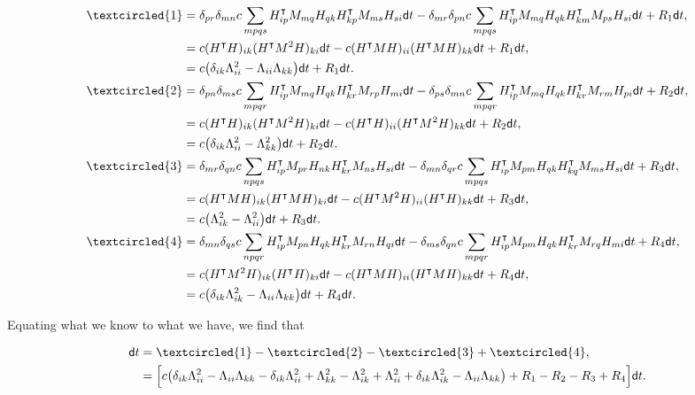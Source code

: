 \begin{align*}
    \textcircled{1} &= \delta_{pr}\delta_{mn}c\sum_{mpqs} \trans H_{ip} M_{mq} H_{qk} \trans H_{kp} M_{ms} H_{si} \d t - \delta_{mr}\delta_{pn} c \sum_{mpqs} \trans H_{ip} M_{mq} H_{qk} \trans H_{km} M_{ps} H_{si} \d t + R_1\d t,\\
    &= c(\trans H H)_{ik}(\trans H M^2 H)_{ki}\d t - c(\trans{H}MH)_{ii}(\trans{H}MH)_{kk}\d t + R_1\d t,\\
    &= c\bigl(\delta_{ik}\Lambda^2_{ii} - \Lambda_{ii}\Lambda_{kk}\bigr)\d t + R_1 \d t.\\
    \textcircled{2} &= \delta_{pn}\delta_{ms}c\sum_{mpqr} \trans H_{ip} M_{mq} H_{qk} \trans H_{kr} M_{rp} H_{mi} \d t - \delta_{ps}\delta_{mn} c \sum_{mpqr} \trans H_{ip} M_{mq} H_{qk} \trans H_{kr} M_{rm} H_{pi} \d t + R_2\d t,\\
    &= c(\trans H H)_{ik}(\trans H M^2 H)_{ki}\d t - c(\trans{H}H)_{ii}(\trans{H}M^2H)_{kk}\d t + R_2\d t,\\
    &= c\bigl(\delta_{ik}\Lambda^2_{ii} - \Lambda^2_{kk}\bigr)\d t + R_2 \d t.\\
    \textcircled{3} &= \delta_{mr}\delta_{qn}c\sum_{npqs} \trans H_{ip} M_{pr} H_{nk} \trans H_{kr} M_{ns} H_{si} \d t - \delta_{mn}\delta_{qr} c \sum_{mpqs} \trans H_{ip} M_{pm} H_{qk} \trans H_{kq} M_{ms} H_{si} \d t + R_3\d t,\\
    &= c(\trans HMH)_{ik}(\trans H M H)_{ki}\d t - c(\trans{H}M^2H)_{ii}(\trans{H}H)_{kk}\d t + R_3\d t,\\
    &= c\bigl(\Lambda^2_{ik} - \Lambda^2_{ii}\bigr)\d t + R_3 \d t.\\
    \textcircled{4} &= \delta_{mn}\delta_{qs}c\sum_{npqr} \trans H_{ip} M_{pn} H_{qk} \trans H_{kr} M_{rn} H_{qi} \d t - \delta_{ms}\delta_{qn} c \sum_{mpqr} \trans H_{ip} M_{pm} H_{qk} \trans H_{kr} M_{rq} H_{mi} \d t + R_4\d t,\\
    &= c(\trans HM^2H)_{ik}(\trans HH)_{ki}\d t - c(\trans{H}MH)_{ii}(\trans{H}MH)_{kk}\d t + R_4\d t,\\
    &= c\bigl(\delta_{ik}\Lambda^2_{ik} - \Lambda_{ii}\Lambda_{kk}\bigr)\d t + R_4 \d t.
\end{align*}

Equating what we know to what we have, we find that

\begin{align*}
    \d t &= \textcircled{1} - \textcircled{2} - \textcircled{3} + \textcircled{4},\\
    &= \Bigl[c\bigl(\delta_{ik}\Lambda^2_{ii} - \Lambda_{ii}\Lambda_{kk} - \delta_{ik}\Lambda^2_{ii} + \Lambda^2_{kk} - \Lambda^2_{ik} + \Lambda^2_{ii} + \delta_{ik}\Lambda^2_{ik} - \Lambda_{ii}\Lambda_{kk}\bigr) + R_1 - R_2 - R_3 + R_4\Bigr]\d t.
\end{align*}


